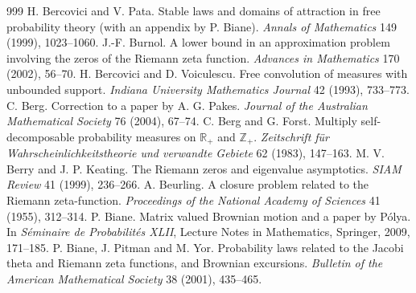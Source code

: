 \begin{thebibliography}{999}
 H. Bercovici and V. Pata. Stable laws and domains of attraction in free probability theory (with an appendix by P. Biane). \emph{Annals of Mathematics} 149 (1999), 1023--1060.
 J.-F. Burnol. A lower bound in an approximation problem involving the zeros of the Riemann zeta function. \emph{Advances in Mathematics} 170 (2002), 56--70.
 H. Bercovici and D. Voiculescu. Free convolution of measures with unbounded support. \emph{Indiana University Mathematics Journal} 42 (1993), 733--773.
 C. Berg. Correction to a paper by A. G. Pakes. \emph{Journal of the Australian Mathematical Society} 76 (2004), 67--74.
 C. Berg and G. Forst. Multiply self-decomposable probability measures on $\mathbb R_+$ and $\mathbb Z_+$. \emph{Zeitschrift f\"ur Wahrscheinlichkeitstheorie und verwandte Gebiete} 62 (1983), 147--163.
 M. V. Berry and J. P. Keating. The Riemann zeros and eigenvalue asymptotics. \emph{SIAM Review} 41 (1999), 236--266.
 A. Beurling. A closure problem related to the Riemann zeta-function. \emph{Proceedings of the National Academy of Sciences} 41 (1955), 312--314.
 P. Biane. Matrix valued Brownian motion and a paper by P\'olya. In \emph{S\'eminaire de Probabilit\'es XLII}, Lecture Notes in Mathematics, Springer, 2009, 171--185.
 P. Biane, J. Pitman and M. Yor. Probability laws related to the Jacobi theta and Riemann zeta functions, and Brownian excursions. \emph{Bulletin of the American Mathematical Society} 38 (2001), 435--465.

\end{thebibliography}
